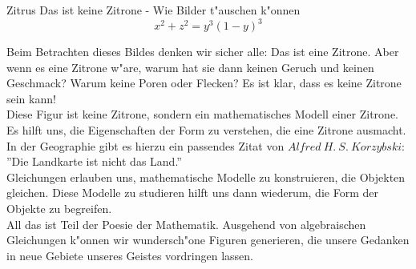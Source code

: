 \begin{surferPage}{Zitrus}
Das ist keine Zitrone - Wie Bilder t"auschen k"onnen\\
\smallskip
\[x^2 + z^2 = y^3 (1 - y)^3\] 


\singlespacing
Beim Betrachten dieses Bildes denken wir sicher alle: Das ist eine Zitrone. Aber wenn es eine Zitrone w"are, warum hat sie dann keinen Geruch und keinen Geschmack? Warum keine Poren oder Flecken? Es ist klar, dass es keine Zitrone sein kann!\\
\singlespacing
Diese Figur ist keine Zitrone, sondern ein mathematisches Modell einer Zitrone. Es hilft uns, die Eigenschaften der Form zu verstehen, die eine Zitrone ausmacht. In der Geographie gibt es hierzu ein passendes Zitat von $Alfred\ H.\ S.\ Korzybski$: ''Die Landkarte ist nicht das Land.'' \\
\singlespacing
Gleichungen erlauben uns, mathematische Modelle zu konstruieren, die Objekten gleichen. Diese Modelle zu studieren hilft uns dann wiederum, die Form der Objekte zu begreifen.\\
\singlespacing
All das ist Teil der Poesie der Mathematik. Ausgehend von algebraischen Gleichungen k"onnen wir wundersch"one Figuren generieren, die unsere Gedanken in neue Gebiete unseres Geistes vordringen lassen.
\end{surferPage}
